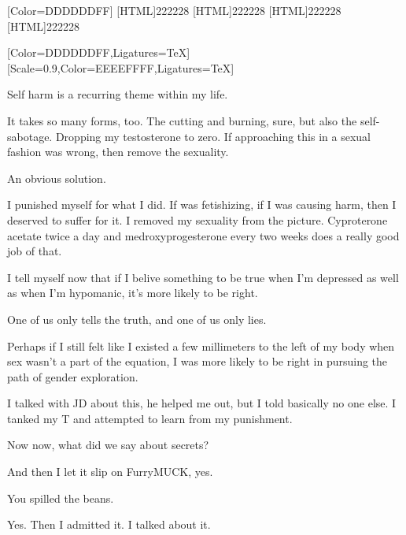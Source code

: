 \label{selfharm:selfharm}
\renewcommand*{\footnoterule}{%
  \kern-3pt%
  \color[HTML]{dddddd}\hrule width 0.4\columnwidth
  \kern2.6pt}
\renewfontfamily{}[Color=DDDDDDFF]
[HTML]{222228}
[HTML]{222228}
[HTML]{222228}
[HTML]{222228}

\begin{paracol}{2}
\begin{leftcolumn}

[Color=DDDDDDFF,Ligatures=TeX]
\renewfontfamily{}[Scale=0.9,Color=EEEEFFFF,Ligatures=TeX]

\noindent Self harm is a recurring theme within my life.

It takes so many forms, too. The cutting and burning, sure, but also the self-sabotage. Dropping my testosterone to zero. If approaching this in a sexual fashion was wrong, then remove the sexuality.

\begin{ally}
An obvious solution.
\end{ally}
I punished myself for what I did. If was fetishizing, if I was causing harm, then I deserved to suffer for it. I removed my sexuality from the picture. Cyproterone acetate twice a day and medroxyprogesterone every two weeks does a really good job of that.

I tell myself now that if I belive something to be true when I'm depressed as well as when I'm hypomanic, it's more likely to be right.

\begin{ally}
One of us only tells the truth, and one of us only lies.
\end{ally}
Perhaps if I still felt like I existed a few millimeters to the left of my body when sex wasn't a part of the equation, I was more likely to be right in pursuing the path of gender exploration.

I talked with JD about this, he helped me out, but I told basically no one else. I tanked my T and attempted to learn from my punishment.

\begin{ally}
Now now, what did we say about secrets?
\end{ally}
And then I let it slip on FurryMUCK, yes.

\begin{ally}
You spilled the beans.
\end{ally}
Yes. Then I admitted it. I talked about it.


\end{leftcolumn}
\end{paracol}
